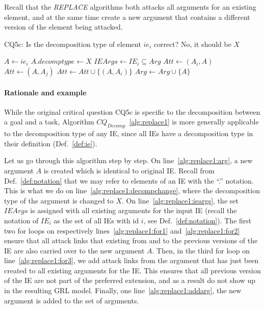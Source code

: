 Recall that the \emph{REPLACE} algorithms both attacks all arguments for an existing element, and at the same time create a new argument that contains a different version of the element being attacked.

\begin{algorithm}[h]
  \caption{CQ5c: Is the decomposition type of element $ie_i$ correct? No, it should be $X$ }\label{alg:replace1}
  \begin{algorithmic}[1]
    \State $A \leftarrow ie_i$\label{alg:replace1:arg}
    \State $A.decomptype\leftarrow X$\label{alg:replace1:decompchange}
    \State $IEArgs\leftarrow IE_i\subseteq  Arg$\label{alg:replace1:ieargs}
    \label{alg:replace1:for1}
      \State $Att\leftarrow (A_i,A)$
    \EndFor
    \label{alg:replace1:for2}
      \State $Att\leftarrow (A,A_j)$
    \label{alg:replace1:for3}
      \State $Att \leftarrow Att \cup \{(A,A_i)\}$\label{alg:replace1:att}
    \EndFor
    \EndFor
    \State $Arg\leftarrow Arg \cup \{A\}$\label{alg:replace1:addarg}
    \EndProcedure
  \end{algorithmic}
\end{algorithm}

\paragraph{Rationale and example} While the original critical question CQ5c is specific to the decomposition between a goal and a task, Algorithm $CQ_{Decomp}$~\ref{alg:replace1} is more generally applicable to the decomposition type of any IE, since all IEs have a decomposition type in their definition (Def.~\ref{def:ie}). 

Let us go through this algorithm step by step. On line~\ref{alg:replace1:arg}, a new argument $A$ is created which is identical to original IE. Recall from Def.~\ref{def:notation} that we may refer to elements of an IE with the ``.'' notation. This is what we do on line~\ref{alg:replace1:decompchange}, where the decomposition type of the argument is changed to $X$. On line~\ref{alg:replace1:ieargs}, the set $IEArgs$ is assigned with all existing arguments for the input IE (recall the notation of $IE_i$ as the set of all IEs with id $i$, see Def.~\ref{def:notation}). The first two for loops on respectively lines~\ref{alg:replace1:for1} and~\ref{alg:replace1:for2} ensure that all attack links that existing from and to the previous versions of the IE are also carried over to the new argument $A$. Then, in the third for loop on line~\ref{alg:replace1:for3}, we add attack links from the argument that has just been created to all existing arguments for the IE. This ensures that all previous version of the IE are not part of the preferred extension, and as a result do not show up in the resulting GRL model. Finally, one line~\ref{alg:replace1:addarg}, the new argument is added to the set of arguments.

